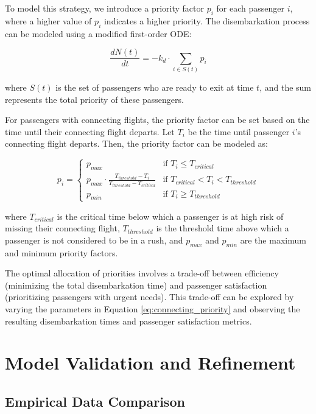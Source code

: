 \documentclass[12pt,a4paper]{article}
\begin{document}
To model this strategy, we introduce a priority factor $p_i$ for each passenger $i$, where a higher value of $p_i$ indicates a higher priority. The disembarkation process can be modeled using a modified first-order ODE:

\begin{equation}
\frac{dN(t)}{dt} = -k_d \cdot \sum_{i \in S(t)} p_i
\label{eq:priority_based}
\end{equation}

where $S(t)$ is the set of passengers who are ready to exit at time $t$, and the sum represents the total priority of these passengers.

For passengers with connecting flights, the priority factor can be set based on the time until their connecting flight departs. Let $T_i$ be the time until passenger $i$'s connecting flight departs. Then, the priority factor can be modeled as:

\begin{equation}
p_i = 
\begin{cases}
p_{max} & \text{if } T_i \leq T_{critical} \\
p_{max} \cdot \frac{T_{threshold} - T_i}{T_{threshold} - T_{critical}} & \text{if } T_{critical} < T_i < T_{threshold} \\
p_{min} & \text{if } T_i \geq T_{threshold}
\end{cases}
\label{eq:connecting_priority}
\end{equation}

where $T_{critical}$ is the critical time below which a passenger is at high risk of missing their connecting flight, $T_{threshold}$ is the threshold time above which a passenger is not considered to be in a rush, and $p_{max}$ and $p_{min}$ are the maximum and minimum priority factors.

The optimal allocation of priorities involves a trade-off between efficiency (minimizing the total disembarkation time) and passenger satisfaction (prioritizing passengers with urgent needs). This trade-off can be explored by varying the parameters in Equation \ref{eq:connecting_priority} and observing the resulting disembarkation times and passenger satisfaction metrics.

\section{Model Validation and Refinement}
\subsection{Empirical Data Comparison}
\end{document}
